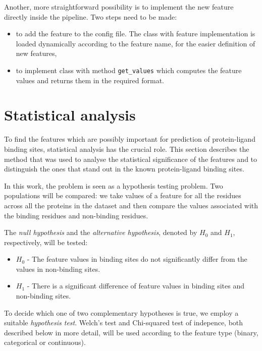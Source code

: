 Another, more straightforward possibility is to implement the new feature directly inside the pipeline. Two steps need to be made:

\begin{itemize}
\item to add the feature to the config file. The class with feature implementation is loaded dynamically according to the feature name, for the easier definition of new features,
\item to implement class with method \texttt{get\_values} which computes the feature values and returns them in the required format.
\end{itemize}

\section{Statistical analysis}

To find the features which are possibly important for prediction of protein-ligand binding sites, statistical analysis has the crucial role. This section describes the method that was used to analyse the statistical significance of the features and to distinguish the ones that stand out in the known protein-ligand binding sites.

In this work, the problem is seen as a hypothesis testing problem. Two populations will be compared: we take values of a feature for all the residues across all the proteins in the dataset and then compare the values associated with the binding residues and non-binding residues.

The \textit{null hypothesis} and the \textit{alternative hypothesis}, denoted by $H_{0}$ and $H_{1}$, respectively, will be tested:

\begin{itemize}
\item \textbf{$H_{0}$} - The feature values in binding sites do not significantly differ from the values in non-binding sites.
\item \textbf{$H_{1}$} - There is a significant difference of feature values in binding sites and non-binding sites.
\end{itemize}

To decide which one of two complementary hypotheses is true, we employ a suitable \textit{hypothesis test}. Welch's test and Chi-squared test of indepence, both described below in more detail, will be used according to the feature type (binary, categorical or continuous). 

